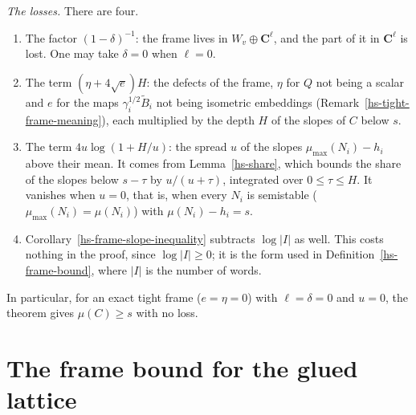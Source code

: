 \begin{remark}
\emph{The losses.} There are four.
\begin{enumerate}
\item The factor $(1-\delta)^{-1}$: the frame lives in $W_v\oplus\mathbf C^\ell$, and the part of
  it in $\mathbf C^\ell$ is lost. One may take $\delta=0$ when $\ell=0$.
\item The term $(\eta+4\sqrt e)H$: the defects of the frame, $\eta$ for $Q$ not being a scalar
  and $e$ for the maps $\gamma_i^{1/2}\tilde B_i$ not being isometric embeddings
  (Remark~\ref{hs-tight-frame-meaning}), each multiplied by the depth $H$ of the slopes of $C$
  below $s$.
\item The term $4u\log(1+H/u)$: the spread $u$ of the slopes $\mu_{\max}(N_i)-h_i$ above their
  mean. It comes from Lemma~\ref{hs-share}, which bounds the share of the slopes below
  $s-\tau$ by $u/(u+\tau)$, integrated over $0\leq\tau\leq H$. It vanishes when $u=0$, that
  is, when every $N_i$ is semistable ($\mu_{\max}(N_i)=\mu(N_i)$) with $\mu(N_i)-h_i=s$.
\item Corollary~\ref{hs-frame-slope-inequality} subtracts $\log|I|$ as well. This costs nothing
  in the proof, since $\log|I|\geq0$; it is the form used in Definition~\ref{hs-frame-bound},
  where $|I|$ is the number of words.
\end{enumerate}
In particular, for an exact tight frame ($e=\eta=0$) with $\ell=\delta=0$ and $u=0$, the theorem
gives $\mu(C)\geq s$ with no loss.
\end{remark}

\section{The frame bound for the glued lattice}\label{section-hs-glued}

